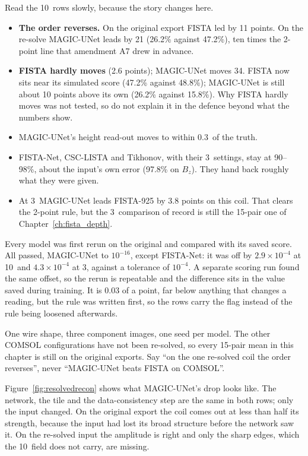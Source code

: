 Read the 10\um\ rows slowly, because the story changes here.

\begin{itemize}
\item \textbf{The order reverses.} On the original export FISTA led by 11 points. On the re-solve MAGIC-UNet leads by
21 (26.2\% against 47.2\%), ten times the 2-point line that amendment A7 drew in advance.
\item \textbf{FISTA hardly moves} (2.6 points); MAGIC-UNet moves 34. FISTA now sits near its simulated score (47.2\%
against 48.8\%); MAGIC-UNet is still about 10 points above its own (26.2\% against 15.8\%). Why FISTA hardly moves was not tested, so do not explain it
in the defence beyond what the numbers show.
\item MAGIC-UNet's height read-out moves to within 0.3\um\ of the truth.
\item FISTA-Net, CSC-LISTA and Tikhonov, with their 3\um\ settings, stay at 90--98\%, about the input's own error
(97.8\% on $B_z$). They hand back roughly what they were given.
\item At 3\um\ MAGIC-UNet leads FISTA-925 by 3.8 points on this coil. That clears the 2-point rule, but the 3\um\
comparison of record is still the 15-pair one of Chapter~\ref{ch:fista_depth}.
\end{itemize}

Every model was first rerun on the original  and compared with its saved score. All passed, MAGIC-UNet to
$10^{-16}$, except FISTA-Net: it was off by $2.9\times10^{-4}$ at 10\um\ and $4.3\times10^{-4}$ at 3\um, against a
tolerance of $10^{-4}$. A separate scoring run found the same offset, so the rerun is repeatable and the difference sits
in the value saved during training. It is 0.03 of a point, far below anything that changes a reading, but the rule was
written first, so the rows carry the flag instead of the rule being loosened afterwards.

\begin{careful}
One wire shape, three component images, one seed per model. The other COMSOL configurations have not been re-solved,
so every 15-pair mean in this chapter is still on the original exports. Say ``on the one re-solved coil the order
reverses'', never ``MAGIC-UNet beats FISTA on COMSOL''.
\end{careful}

Figure~\ref{fig:resolvedrecon} shows what MAGIC-UNet's drop looks like. The network, the tile and the data-consistency step are
the same in both rows; only the input changed. On the original export the coil comes out at less than half its
strength, because the input had lost its broad structure before the network saw it. On the re-solved input the
amplitude is right and only the sharp edges, which the 10\um\ field does not carry, are missing.


